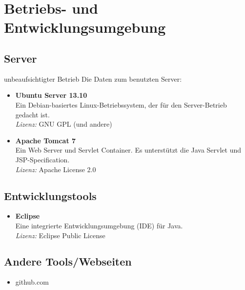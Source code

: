 \section{Betriebs- und Entwicklungsumgebung}

\subsection{Server}
unbeaufsichtigter Betrieb
Die Daten zum benutzten Server:
\begin{itemize}
	\item \textbf{Ubuntu Server 13.10} \\
	Ein Debian-basiertes Linux-Betriebssystem, der für den Server-Betrieb gedacht ist. \\
	\textit{Lizenz:} GNU GPL (und andere)
	\item \textbf{Apache Tomcat 7} \\
	Ein Web Server und Servlet Container. Es unterstützt die Java Servlet  und JSP-Specification. \\
	\textit{Lizenz:} Apache License 2.0
\end{itemize}

\subsection{Entwicklungstools}
\begin{itemize}
	\item \textbf{Eclipse} \\
	Eine integrierte Entwicklungsumgebung (IDE) für Java. \\
	\textit{Lizenz:} Eclipse Public License
\end{itemize}

\subsection{Andere Tools/Webseiten}
\begin{itemize}
	\item github.com
\end{itemize}

